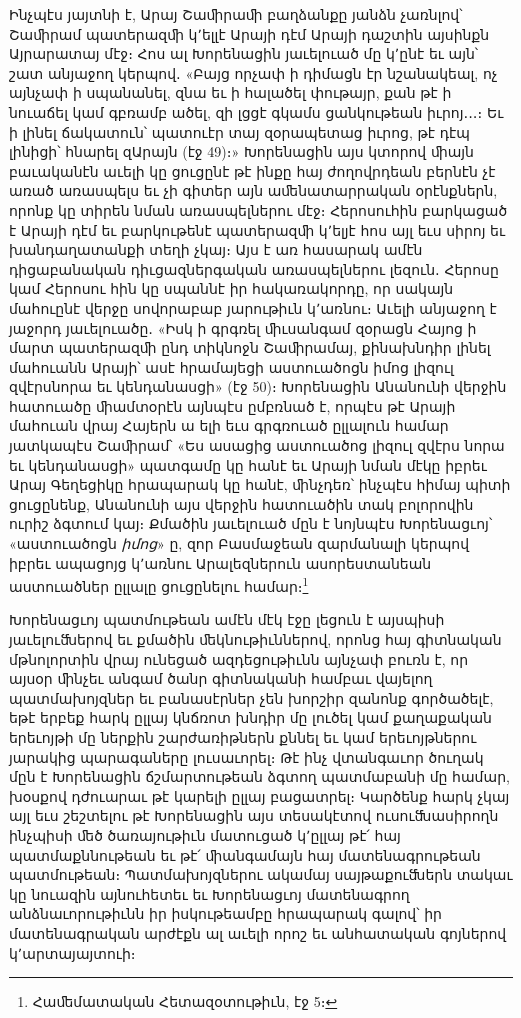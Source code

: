 \documentclass{article}
\begin{document}
{Ինչպէս յայտնի է, Արայ Շաﬕրաﬕ բաղձանքը յանձն չառնլով՝ Շաﬕրամ պատերազﬕ կ՚ելլէ Արայի դէմ Արայի դաշտին այսինքն Այրարատայ մէջ։ Հոս ալ Խորենացին յաւելուած մը կ՚ընէ եւ այն՝ շատ անյաջող կերպով․ «Բայց որչափ ի դիմացն էր նշանակեալ, ոչ այնչափ ի սպանանել, զնա եւ ի հալածել փութայր, քան թէ ի նուաճել կամ գբռամբ ածել, զի լցցէ գկամս ցանկութեան իւրոյ․․․։ Եւ ի լինել ճակատուն՝ պատուէր տայ զօրապետաց իւրոց, թէ դէպ լինիցի՝ հնարել զԱրայն (էջ 49)։» Խորենացին այս կտորով ﬕայն բաւականէն աւելի կը ցուցընէ թէ ինքը հայ ժողովրդեան բերնէն չէ առած առասպելս եւ չի գիտեր այն աﬔնատարրական օրէնքներն, որոնք կը տիրեն նման առասպելներու մէջ։ Հերոսուհին բարկացած է Արայի դէմ եւ բարկութենէ պատերազﬕ կ՚ելյէ հոս այլ եւս սիրոյ եւ խանդաղատանքի տեղի չկայ։ Այս է առ հասարակ ամէն դիցաբանական դիւցազներգական առասպելներու լեզուն․ Հերոսը կամ Հերոսու հին կը սպաննէ իր հակառակորդը, որ սակայն մահուընէ վերջը սովորաբաբ յարութիւն կ՚առնու։ Աւելի անյաջող է յաջորդ յաւելուածը․ «Իսկ ի գրգռել ﬕւսանգամ զօրացն Հայոց ի մարտ պատերազﬕ ընդ տիկնոջն Շաﬕրամայ, քինախնդիր լինել մահուանն Արայի՝ ասէ հրամայեցի աստուածոցն իմոց լիզուլ զվէրսնորա եւ կենդանասցի» (էջ 50)։ Խորենացին Անանունի վերջին հատուածը ﬕամտօրէն այնպէս ըմբռնած է, որպէս թէ Արայի մահուան վրայ Հայերն ա ելի եւս գրգռուած ըլլալուն համար յատկապէս Շաﬕրամ՝ «Ես ասացից աստուածոց լիզուլ զվէրս նորա եւ կենդանասցի» պատգամը կը հանէ եւ Արայի նման մէկը իբրեւ Արայ Գեղեցիկը հրապարակ կը հանէ, ﬕնչդեռ՝ ինչպէս հիմայ պիտի ցուցընենք, Անանունի այս վերջին հատուածին տակ բոլորովին ուրիշ ձգտում կայ։ Քմածին յաւելուած մըն է նոյնպէս Խորենացւոյ՝ «աստուածոցն \emph{իմոց}» ը, զոր Բասմաջեան զարմանալի կերպով իբրեւ ապացոյց կ՚առնու Արալեզներուն ասորեստանեան աստուածներ ըլլալը ցուցընելու համար։\footnote{Հաﬔմատական Հետազօտութիւն, էջ 5։}

Խորենացւոյ պատմութեան ամէն մէկ էջը լեցուն է այսպիսի յաւելուﬓերով եւ քմածին ﬔկնութիւններով, որոնց հայ գիտնական մթնոլորտին վրայ ունեցած ազդեցութիւնն այնչափ բուռն է, որ այսօր ﬕնչեւ անգամ ծանր գիտնականի համբաւ վայելող պատմախոյզներ եւ բանասէրներ չեն խորշիր զանոնք գործածելէ, եթէ երբեք հարկ ըլլայ կնճռոտ խնդիր մը լուծել կամ քաղաքական երեւոյթի մը ներքին շարժառիթներն քննել եւ կամ երեւոյթներու յարակից պարագաները լուսաւորել։ Թէ ինչ վտանգաւոր ծուղակ մըն է Խորենացին ճշմարտութեան ձգտող պատմաբանի մը համար, խօսքով դժուարաւ թէ կարելի ըլլայ բացատրել։ Կարծենք հարկ չկայ այլ եւս շեշտելու թէ Խորենացին այս տեսակէտով ուսուﬓասիրողն ինչպիսի ﬔծ ծառայութիւն մատուցած կ՚ըլլայ թէ՛ հայ պատմաքննութեան եւ թէ՛ ﬕանգամայն հայ մատենագրութեան պատմութեան։ Պատմախոյզներու ակամայ սայթաքուﬓերն տակաւ կը նուազին այնուհետեւ եւ Խորենացւոյ մատենագրող անձնաւորութիւնն իր իսկութեամբը հրապարակ գալով՝ իր մատենագրական արժէքն ալ աւելի որոշ եւ անհատական գոյներով կ՚արտայայտուի։

}
\end{document}
